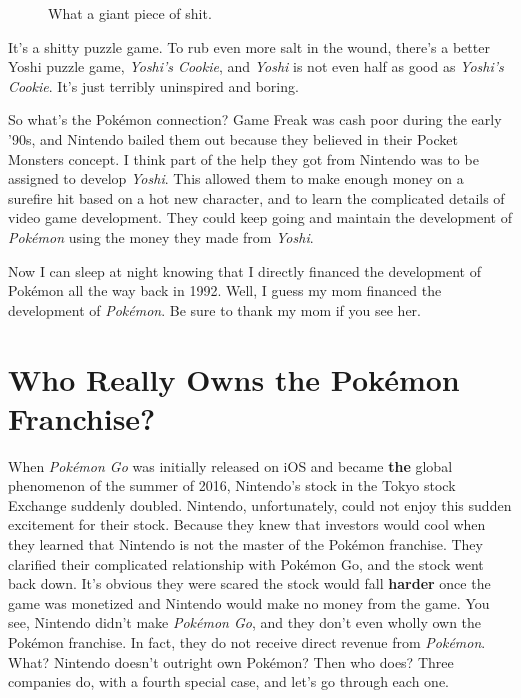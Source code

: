 \documentclass{book}
\begin{document}
\FloatBarrier\vspace{\baselineskip}\begin{figure}[H]\caption*{What a giant piece of shit.}\end{figure}
It’s a shitty puzzle game. To rub even more salt in the wound, there’s a better Yoshi puzzle game, \emph{Yoshi’s Cookie}, and \emph{Yoshi} is not even half as good as \emph{Yoshi’s Cookie}. It’s just terribly uninspired and boring.\par
So what’s the Pokémon connection? Game Freak was cash poor during the early ’90s, and Nintendo bailed them out because they believed in their Pocket Monsters concept. I think part of the help they got from Nintendo was to be assigned to develop \emph{Yoshi}. This allowed them to make enough money on a surefire hit based on a hot new character,
 and to learn the complicated details of video game development. They could keep going and maintain the development of \emph{Pokémon} using the money they made from \emph{Yoshi}.\par
Now I can sleep at night knowing that I directly financed the development of Pokémon all the way back in 1992. Well, I guess my mom financed the development of \emph{Pokémon}. Be sure to thank my mom if you see her.\par
\FloatBarrier\section*{Who Really Owns the Pokémon Franchise?}
When \emph{Pokémon Go} was initially released on iOS and became \textbf{the} global phenomenon of the summer of 2016, Nintendo’s stock in the Tokyo stock Exchange suddenly doubled. Nintendo, unfortunately, could not enjoy this sudden excitement for their stock. Because they knew that investors would cool when they learned that Nintendo is not the master of the Pokémon franchise. They clarified their complicated relationship with Pokémon Go, and the stock went back down. It’s obvious they were scared the stock would fall \textbf{harder} once the game was monetized and Nintendo would make no money from the game. You see, Nintendo didn’t make \emph{Pokémon Go}, and they don’t even wholly own the Pokémon franchise. In fact, they do not receive direct revenue from \emph{Pokémon}. What? Nintendo doesn’t outright own Pokémon? Then who does? Three companies do, with a fourth special case, and let’s go through each one.\par
\end{document}
